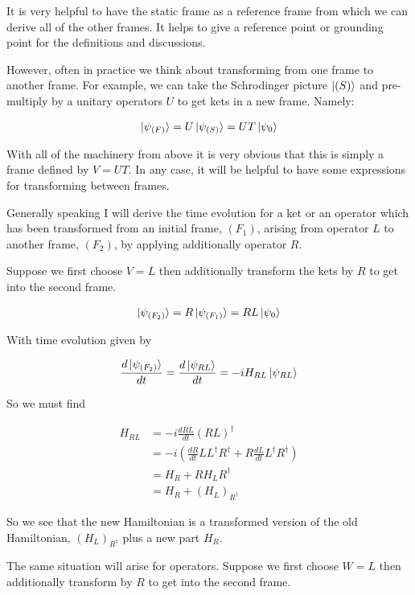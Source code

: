 \documentclass[12pt]{article}
\newcommand{\ddt}[1]{\frac{d #1}{dt}}
\begin{document}
It is very helpful to have the static frame as a reference frame from which we can derive all of the other frames. It helps to give a reference point or grounding point for the definitions and discussions.

However, often in practice we think about transforming from one frame to another frame. For example, we can take the Schrodinger picture $\ket{(S)}$ and pre-multiply by a unitary operators $U$ to get kets in a new frame. Namely:

\begin{align}
\ket{\psi_{(F)}} = U\ket{\psi_{(S)}} = UT \ket{\psi_0}
\end{align}

With all of the machinery from above it is very obvious that this is simply a frame defined by $V = UT$. In any case, it will be helpful to have some expressions for transforming between frames. 

Generally speaking I will derive the time evolution for a ket or an operator which has been transformed from an initial frame, $(F_1)$, arising from operator $L$ to another frame, $(F_2)$, by applying additionally operator $R$.

Suppose we first choose $V=L$ then additionally transform the kets by $R$ to get into the second frame.

\begin{align}
\ket{\psi_{(F_2)}} = R\ket{\psi_{(F_1)}} = RL\ket{\psi_0}
\end{align}

With time evolution given by

\begin{align}
\ddt{\ket{\psi_{(F_2)}}} = \ddt{\ket{\psi_{RL}}} = -i H_{RL} \ket{\psi_{RL}}
\end{align}

So we must find

\begin{align}
H_{RL} &= -i \ddt{RL} (RL)^{\dag}\\
&= -i\left(\ddt{R}LL^{\dag}R^{\dag} + R\ddt{L}L^{\dag} R^{\dag} \right)\\
&= H_R + RH_LR^{\dag}\\
&= H_R + (H_L)_{R^{\dag}}
\end{align}

So we see that the new Hamiltonian is a transformed version of the old Hamiltonian, $(H_L)_{R^{\dag}}$ plus a new part $H_R$.

The same situation will arise for operators. Suppose we first choose $W=L$ then additionally transform by $R$ to get into the second frame.
\end{document}
